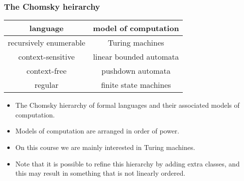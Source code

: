 \documentclass[handout]{beamer}
\begin{document}
\begin{frame}
\frametitle{The Chomsky heirarchy}
\begin{center}
\begin{tabular}{ |c| c | }
 \hline \textbf{language} & \textbf{model of computation} \\ \hline
 recursively enumerable & Turing machines \\ \hline 
 context-sensitive & linear bounded automata \\ \hline
 context-free & pushdown automata \\ \hline
 regular & finite state machines\\ \hline
\end{tabular}
\end{center}
\begin{itemize}
\item The Chomsky hierarchy of formal languages and their associated models of computation. 
\item Models of computation are arranged in order of power. 
\item On this course we are mainly interested in Turing machines. 
\item Note that it is possible to refine this hierarchy by adding extra classes, and this may result in something that is not linearly ordered.
\end{itemize}
\end{frame}
\end{document}
